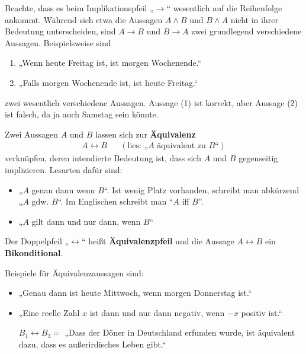 \begin{bem}
    Beachte, dass es beim Implikationspfeil „$\to$“ wesentlich auf die Reihenfolge ankommt. Während sich etwa die Aussagen $A\land B$ und $B\land A$ nicht in ihrer Bedeutung unterscheiden, sind $A\to B$ und $B\to A$ zwei grundlegend verschiedene Aussagen. Beispielsweise sind
    \begin{enumerate}[(1)]
        \item „Wenn heute Freitag ist, ist morgen Wochenende.“
        \item „Falls morgen Wochenende ist, ist heute Freitag.“
    \end{enumerate}
    zwei wesentlich verschiedene Aussagen. Aussage (1) ist korrekt, aber Aussage (2) ist falsch, da ja auch Samstag sein könnte.
\end{bem}


\begin{defin}[Äquivalenz] 
    Zwei Aussagen $A$ und $B$ lassen sich zur \textbf{Äquivalenz}
    \begin{align*}
        A\leftrightarrow B  && (\text{lies: „$A$ äquivalent zu $B$“})
    \end{align*}
    verknüpfen, deren intendierte Bedeutung ist, dass sich $A$ und $B$ gegenseitig implizieren. Lesarten dafür sind:
    \begin{itemize}
        \item „$A$ genau dann wenn $B$“. Ist wenig Platz vorhanden, schreibt man abkürzend „$A$ gdw. $B$“. Im Englischen schreibt man ``$A$ iff $B$''.
        \item „$A$ gilt dann und nur dann, wenn $B$“
    \end{itemize}
    Der Doppelpfeil „$\leftrightarrow$“ heißt \textbf{Äquivalenzpfeil} und die Aussage $A\leftrightarrow B$ ein \textbf{Bikonditional}.
\end{defin}

    
\begin{bsp}
    Beispiele für Äquivalenzaussagen sind:
    \begin{itemize}[labelindent=5.5em, labelwidth=, leftmargin=*]
        \item „Genau dann ist heute Mittwoch, wenn morgen Donnerstag ist.“
        \item „Eine reelle Zahl $x$ ist dann und nur dann negativ, wenn $-x$ positiv ist.“
        \item[$B_1\leftrightarrow B_3=$] „Dass der Döner in Deutschland erfunden wurde, ist äquivalent dazu, dass es außerirdisches Leben gibt.“
    \end{itemize}
\end{bsp}


